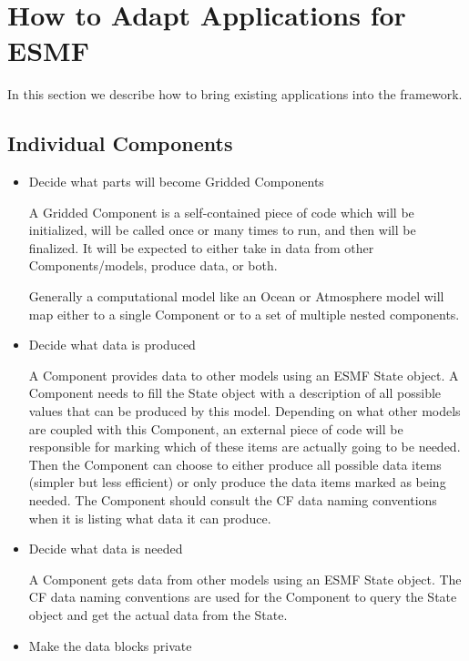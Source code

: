 
\section{How to Adapt Applications for ESMF}
\label{sec:Adoption}

In this section we describe how to bring existing applications 
into the framework.

\subsection{Individual Components}

\begin{itemize}

\item Decide what parts will become Gridded Components 

A Gridded Component is a self-contained
piece of code which will be initialized, will be called once or many times
to run, and then will be finalized.  It will be expected to either take in
data from other Components/models, produce data, or both.

Generally a computational model like an Ocean or Atmosphere model will
map either to a single Component or to a set of multiple nested
components.

\item Decide what data is produced 

A Component provides data to other models using an ESMF State
object.  A Component needs to fill the State object with a description of
all possible values that can be produced by this model.  Depending on what
other models are coupled with this Component, an external piece of code
will be responsible for marking which of these items are actually going to
be needed.  Then the Component can choose to either produce all possible
data items (simpler but less efficient) or only produce the data items
marked as being needed.  The Component should consult the CF data naming
conventions when it is listing what data it can produce.

\item Decide what data is needed 

A Component gets data from other models using an ESMF State object.
The CF data naming conventions are used for the Component to query
the State object and get the actual data from the State.

\item Make the data blocks private 


\end{itemize}
